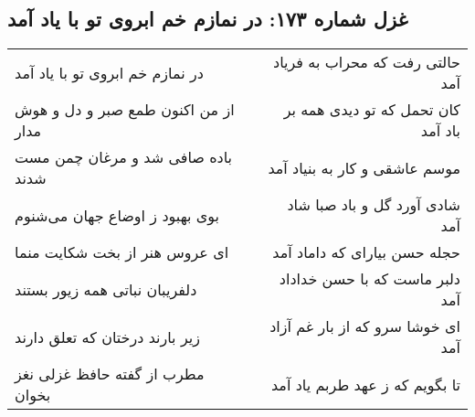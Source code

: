 \begin{center}
\section*{غزل شماره ۱۷۳: در نمازم خم ابروی تو با یاد آمد}
\label{sec:sh173}
\begin{longtable}{l p{0.5cm} r}
در نمازم خم ابروی تو با یاد آمد
&&
حالتی رفت که محراب به فریاد آمد
\\
از من اکنون طمع صبر و دل و هوش مدار
&&
کان تحمل که تو دیدی همه بر باد آمد
\\
باده صافی شد و مرغان چمن مست شدند
&&
موسم عاشقی و کار به بنیاد آمد
\\
بوی بهبود ز اوضاع جهان می‌شنوم
&&
شادی آورد گل و باد صبا شاد آمد
\\
ای عروس هنر از بخت شکایت منما
&&
حجله حسن بیارای که داماد آمد
\\
دلفریبان نباتی همه زیور بستند
&&
دلبر ماست که با حسن خداداد آمد
\\
زیر بارند درختان که تعلق دارند
&&
ای خوشا سرو که از بار غم آزاد آمد
\\
مطرب از گفته حافظ غزلی نغز بخوان
&&
تا بگویم که ز عهد طربم یاد آمد
\\
\end{longtable}
\end{center}
